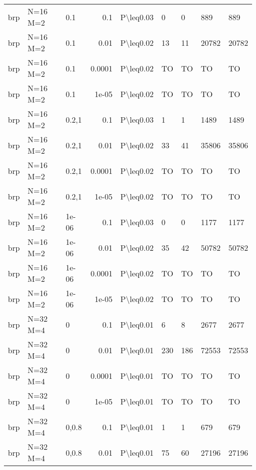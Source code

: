 \begin{longtable}{lllrlllll}
 brp           & N=16 M=2  & 0.1   & 0.1    & P\textbackslash{}leq0.03  & 0    & 0    & 889      & 889     \\
 brp           & N=16 M=2  & 0.1   & 0.01   & P\textbackslash{}leq0.02  & 13   & 11   & 20782    & 20782   \\
 brp           & N=16 M=2  & 0.1   & 0.0001 & P\textbackslash{}leq0.02  & TO   & TO   & TO       & TO      \\
 brp           & N=16 M=2  & 0.1   & 1e-05  & P\textbackslash{}leq0.02  & TO   & TO   & TO       & TO      \\
 brp           & N=16 M=2  & 0.2,1 & 0.1    & P\textbackslash{}leq0.03  & 1    & 1    & 1489     & 1489    \\
 brp           & N=16 M=2  & 0.2,1 & 0.01   & P\textbackslash{}leq0.02  & 33   & 41   & 35806    & 35806   \\
 brp           & N=16 M=2  & 0.2,1 & 0.0001 & P\textbackslash{}leq0.02  & TO   & TO   & TO       & TO      \\
 brp           & N=16 M=2  & 0.2,1 & 1e-05  & P\textbackslash{}leq0.02  & TO   & TO   & TO       & TO      \\
 brp           & N=16 M=2  & 1e-06 & 0.1    & P\textbackslash{}leq0.03  & 0    & 0    & 1177     & 1177    \\
 brp           & N=16 M=2  & 1e-06 & 0.01   & P\textbackslash{}leq0.02  & 35   & 42   & 50782    & 50782   \\
 brp           & N=16 M=2  & 1e-06 & 0.0001 & P\textbackslash{}leq0.02  & TO   & TO   & TO       & TO      \\
 brp           & N=16 M=2  & 1e-06 & 1e-05  & P\textbackslash{}leq0.02  & TO   & TO   & TO       & TO      \\
 brp           & N=32 M=4  & 0     & 0.1    & P\textbackslash{}leq0.01  & 6    & 8    & 2677     & 2677    \\
 brp           & N=32 M=4  & 0     & 0.01   & P\textbackslash{}leq0.01  & 230  & 186  & 72553    & 72553   \\
 brp           & N=32 M=4  & 0     & 0.0001 & P\textbackslash{}leq0.01  & TO   & TO   & TO       & TO      \\
 brp           & N=32 M=4  & 0     & 1e-05  & P\textbackslash{}leq0.01  & TO   & TO   & TO       & TO      \\
 brp           & N=32 M=4  & 0,0.8 & 0.1    & P\textbackslash{}leq0.01  & 1    & 1    & 679      & 679     \\
 brp           & N=32 M=4  & 0,0.8 & 0.01   & P\textbackslash{}leq0.01  & 75   & 60   & 27196    & 27196   \\

\end{longtable}
